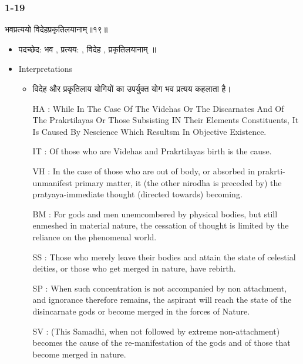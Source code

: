 \begin{frame}[fragile]\frametitle{1-19}
\begin{sanskrit}
भवप्रत्ययो विदेहप्रकृतिलयानाम्॥१९॥
\end{sanskrit}

	\begin{itemize}
	\item पदच्छेद: भव , प्रत्यय: , विदेह , प्रकृतिलयानाम् ॥
	\item Interpretations
		\begin{itemize}		
		\item विदेह और प्रकृतिलाय योगियों का उपर्युक्त योग भव प्रत्यय कहलाता है।
		\item [HA]: While In The Case Of The Videhas Or The Discarnates And Of The Prakrtilayas Or Those Subsisting IN Their Elements Constituents, It Is Caused By Nescience Which Resultsm In Objective Existence.
		\item [IT]: Of those who are Videhas and Prakrtilayas birth is the cause.
		\item [VH]: In the case of those who are out of body, or absorbed in prakrti-unmanifest primary matter, it (the other nirodha is preceded by) the pratyaya-immediate thought (directed towards) becoming.
		\item [BM]: For gods and men unemcombered by physical bodies, but still enmeshed in material nature, the cessation of thought is limited by the reliance on the phenomenal world.
		\item [SS]: Those who merely leave their bodies and attain the state of celestial deities, or those who get merged in nature, have rebirth.
		\item [SP]: When such concentration is not accompanied by non attachment, and ignorance therefore remains, the aspirant will reach the state of the disincarnate gods or become merged in the forces of Nature.
		\item [SV]: (This Samadhi, when not followed by extreme non-attachment) becomes the cause of the re-manifestation of the gods and of those that become merged in nature. 
		\end{itemize}
	\end{itemize}
	
\end{frame}

